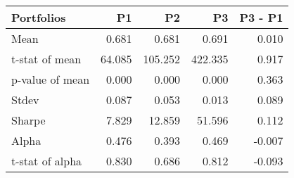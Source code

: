 \begin{tabular}{lrrrr}
\toprule
Portfolios & P1 & P2 & P3 & P3 - P1 \\
\midrule
Mean & 0.681 & 0.681 & 0.691 & 0.010 \\
t-stat of mean & 64.085 & 105.252 & 422.335 & 0.917 \\
p-value of mean & 0.000 & 0.000 & 0.000 & 0.363 \\
Stdev & 0.087 & 0.053 & 0.013 & 0.089 \\
Sharpe & 7.829 & 12.859 & 51.596 & 0.112 \\
Alpha & 0.476 & 0.393 & 0.469 & -0.007 \\
t-stat of alpha & 0.830 & 0.686 & 0.812 & -0.093 \\
\bottomrule
\end{tabular}
